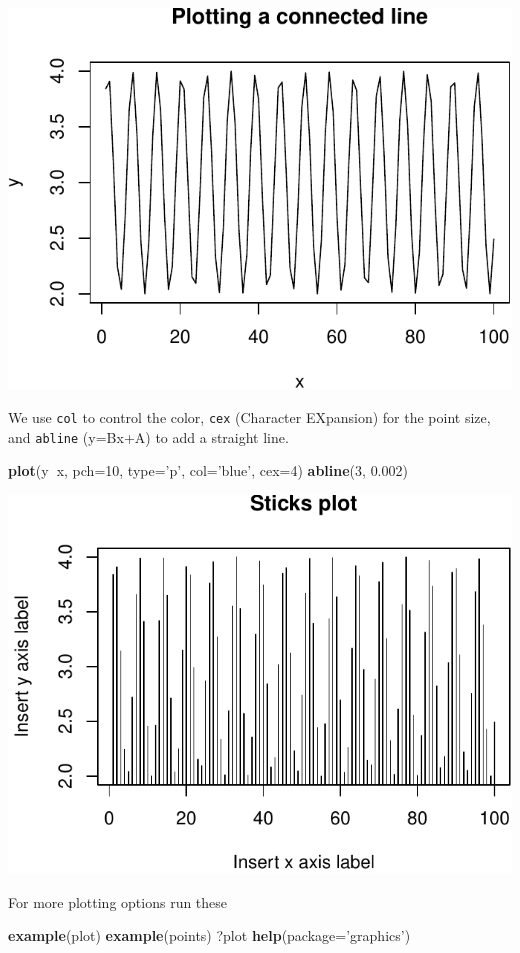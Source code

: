 \documentclass[]{book}
\newenvironment{Shaded}{\begin{snugshade}}{\end{snugshade}}
\newcommand{\KeywordTok}[1]{\textcolor[rgb]{0.13,0.29,0.53}{\textbf{#1}}}
\newcommand{\DataTypeTok}[1]{\textcolor[rgb]{0.13,0.29,0.53}{#1}}
\newcommand{\DecValTok}[1]{\textcolor[rgb]{0.00,0.00,0.81}{#1}}
\newcommand{\FloatTok}[1]{\textcolor[rgb]{0.00,0.00,0.81}{#1}}
\newcommand{\StringTok}[1]{\textcolor[rgb]{0.31,0.60,0.02}{#1}}
\newcommand{\OperatorTok}[1]{\textcolor[rgb]{0.81,0.36,0.00}{\textbf{#1}}}
\newcommand{\NormalTok}[1]{#1}
\theoremstyle{definition}
\theoremstyle{definition}
\theoremstyle{definition}
\theoremstyle{remark}
\begin{document}
\includegraphics[width=0.5\linewidth]{Rcourse_files/figure-latex/unnamed-chunk-34-1}

We use \texttt{col} to control the color, \texttt{cex} (Character
EXpansion) for the point size, and \texttt{abline} (y=Bx+A) to add a
straight line.

\begin{Shaded}
\begin{Highlighting}[]
\KeywordTok{plot}\NormalTok{(y}\OperatorTok{~}\NormalTok{x, }\DataTypeTok{pch=}\DecValTok{10}\NormalTok{, }\DataTypeTok{type=}\StringTok{'p'}\NormalTok{, }\DataTypeTok{col=}\StringTok{'blue'}\NormalTok{, }\DataTypeTok{cex=}\DecValTok{4}\NormalTok{) }
\KeywordTok{abline}\NormalTok{(}\DecValTok{3}\NormalTok{, }\FloatTok{0.002}\NormalTok{) }
\end{Highlighting}
\end{Shaded}

\includegraphics[width=0.5\linewidth]{Rcourse_files/figure-latex/unnamed-chunk-35-1}

For more plotting options run these

\begin{Shaded}
\begin{Highlighting}[]
\KeywordTok{example}\NormalTok{(plot)}
\KeywordTok{example}\NormalTok{(points)}
\NormalTok{?plot}
\KeywordTok{help}\NormalTok{(}\DataTypeTok{package=}\StringTok{'graphics'}\NormalTok{)}
\end{Highlighting}
\end{Shaded}
\end{document}
